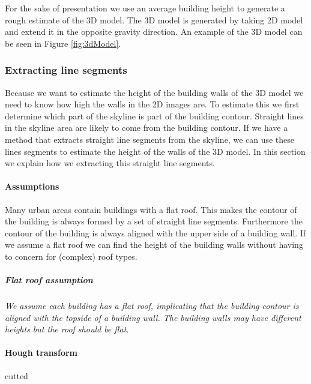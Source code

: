 For the sake of presentation we use an average building height to generate a
rough estimate of the 3D model.  The 3D model is generated by taking 2D model
and extend it in the opposite gravity direction.  An example of the 3D model can
be seen in Figure \ref{fig:3dModel}.





\subsubsection{Extracting line segments}
\label{extractinglinesegments}
	Because we want to estimate the height of the building walls of the 3D model we
	need to know how high the walls in the 2D images are.  To estimate this we
	first determine which part of the skyline is part of the building contour.
	Straight lines in the skyline area are likely to come from the building
	contour.  If we have a method that extracts straight line segments from the
	skyline, we can use these lines segments to estimate the height of the walls
	of the 3D model.  In this section we explain how we extracting this straight
	line segments.  \\

\paragraph{Assumptions}
	Many urban areas contain buildings with a flat roof. This makes the contour
	of the building is always formed by a set of straight line segments.
	Furthermore the contour of the building is always aligned with the upper side
	of a building wall.  
	If we assume a flat roof we can find the height of the building walls without
	having to concern for (complex) roof types.

	\subparagraph{Flat roof assumption}
	\emph{We assume each building has a flat roof, implicating that the building
	contour is aligned with the topside of a building wall.  The building walls
	may have different heights but the roof should be flat.}\\


\paragraph{Hough transform}
cutted

